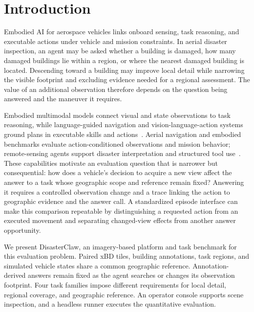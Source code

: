 \section{Introduction}
Embodied AI for aerospace vehicles links onboard sensing, task reasoning, and executable actions under vehicle and mission constraints. In aerial disaster inspection, an agent may be asked whether a building is damaged, how many damaged buildings lie within a region, or where the nearest damaged building is located. Descending toward a building may improve local detail while narrowing the visible footprint and excluding evidence needed for a regional assessment. The value of an additional observation therefore depends on the question being answered and the maneuver it requires.

Embodied multimodal models connect visual and state observations to task reasoning, while language-guided navigation and vision-language-action systems ground plans in executable skills and actions~\cite{driess2023palme,shah2023lmnav,ichter2023saycan,zitkovich2023rt2}. Aerial navigation and embodied benchmarks evaluate action-conditioned observations and mission behavior; remote-sensing agents support disaster interpretation and structured tool use~\cite{liu2023aerialvln,lee2025citynav,gao2026openfly,yao2024aeroverse,guo2026bedi,zhao2025cityeqa,liu2024rescueadi,thinkgeo2025}. These capabilities motivate an evaluation question that is narrower but consequential: how does a vehicle's decision to acquire a new view affect the answer to a task whose geographic scope and reference remain fixed? Answering it requires a controlled observation change and a trace linking the action to geographic evidence and the answer call. A standardized episode interface can make this comparison repeatable by distinguishing a requested action from an executed movement and separating changed-view effects from another answer opportunity.

We present DisasterClaw, an imagery-based platform and task benchmark for this evaluation problem. Paired xBD tiles, building annotations, task regions, and simulated vehicle states share a common geographic reference. Annotation-derived answers remain fixed as the agent searches or changes its observation footprint. Four task families impose different requirements for local detail, regional coverage, and geographic reference. An operator console supports scene inspection, and a headless runner executes the quantitative evaluation.

